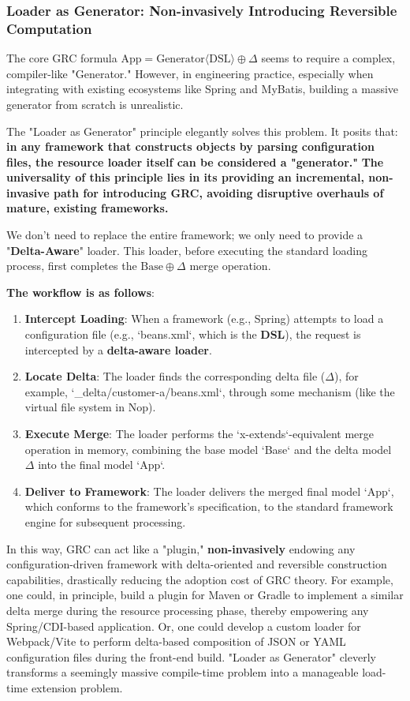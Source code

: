 \documentclass[11pt]{article}
\begin{document}
\subsubsection{Loader as Generator: Non-invasively Introducing Reversible Computation}

The core GRC formula $\text{App} = \text{Generator}\langle\text{DSL}\rangle \oplus \Delta$ seems to require a complex, compiler-like "Generator." However, in engineering practice, especially when integrating with existing ecosystems like Spring and MyBatis, building a massive generator from scratch is unrealistic.

The "Loader as Generator" principle elegantly solves this problem. It posits that: \textbf{in any framework that constructs objects by parsing configuration files, the resource loader itself can be considered a "generator."} \textbf{The universality of this principle lies in its providing an incremental, non-invasive path for introducing GRC, avoiding disruptive overhauls of mature, existing frameworks.}

We don't need to replace the entire framework; we only need to provide a "\textbf{Delta-Aware}" loader. This loader, before executing the standard loading process, first completes the $\text{Base} \oplus \Delta$ merge operation.

\textbf{The workflow is as follows}:
\begin{enumerate}
    \item \textbf{Intercept Loading}: When a framework (e.g., Spring) attempts to load a configuration file (e.g., `beans.xml`, which is the \textbf{DSL}), the request is intercepted by a \textbf{delta-aware loader}.
    \item \textbf{Locate Delta}: The loader finds the corresponding delta file ($\Delta$), for example, `\_delta/customer-a/beans.xml`, through some mechanism (like the virtual file system in Nop).
    \item \textbf{Execute Merge}: The loader performs the `x-extends`-equivalent merge operation in memory, combining the base model `Base` and the delta model $\Delta$ into the final model `App`.
    \item \textbf{Deliver to Framework}: The loader delivers the merged final model `App`, which conforms to the framework's specification, to the standard framework engine for subsequent processing.
\end{enumerate}

In this way, GRC can act like a "plugin," \textbf{non-invasively} endowing any configuration-driven framework with delta-oriented and reversible construction capabilities, drastically reducing the adoption cost of GRC theory. For example, one could, in principle, build a plugin for Maven or Gradle to implement a similar delta merge during the resource processing phase, thereby empowering any Spring/CDI-based application. Or, one could develop a custom loader for Webpack/Vite to perform delta-based composition of JSON or YAML configuration files during the front-end build. "Loader as Generator" cleverly transforms a seemingly massive compile-time problem into a manageable load-time extension problem.
\end{document}

